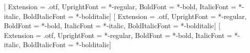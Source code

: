 
\usepackage{fontspec}
\setmainfont{texgyretermes}[
  Extension      = .otf,
  UprightFont    = *-regular,
  BoldFont       = *-bold,
  ItalicFont     = *-italic,
  BoldItalicFont = *-bolditalic]
\setsansfont{texgyreheros}[
  Extension      = .otf,
  UprightFont    = *-regular,
  BoldFont       = *-bold,
  ItalicFont     = *-italic,
  BoldItalicFont = *-bolditalic]
\setmonofont{texgyrecursor}[
  Extension      = .otf,
  UprightFont    = *-regular,
  BoldFont       = *-bold,
  ItalicFont     = *-italic,
  BoldItalicFont = *-bolditalic]

\usepackage[english]{babel}

\usepackage[table]{xcolor}

\usepackage[a4paper, top=2.5cm, bottom=2.5cm, left=2.5cm, right=2.2cm,
            headheight=14pt]{geometry}
\usepackage{setspace}
\setlength{\parskip}{0.45em}
\setlength{\parindent}{0pt}

\usepackage{fancyhdr}
\pagestyle{fancy}
\fancyhf{}
\fancyfoot[C]{\small\thepage}
\renewcommand{\headrulewidth}{0.4pt}
\fancypagestyle{plain}{%
  \fancyhf{}\fancyfoot[C]{\small\thepage}\renewcommand{\headrulewidth}{0pt}}

